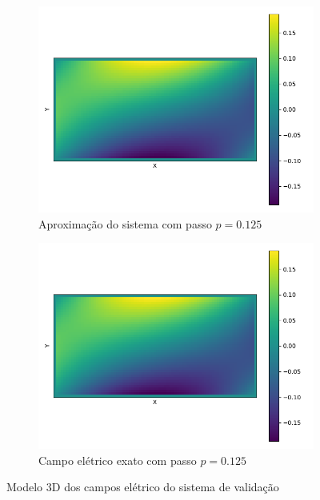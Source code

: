 \documentclass[oneside]{abntex2}
\begin{document}
\begin{figure}[h]
  \begin{subfigure}[b]{0.5\textwidth}
    \includegraphics[width=\textwidth]{imgs/hmap_aprox_val_elet_1250.png}
    \caption{Aproximação do sistema com passo $p = 0.125$}
    \label{3d_aprox_val_1250}
  \end{subfigure}
  \begin{subfigure}[b]{0.5\textwidth}
    \includegraphics[width=\textwidth]{imgs/hmap_grnd_val_elet_1250.png}
    \caption{Campo elétrico exato com passo $p = 0.125$}
    \label{3d_exat_val_1250}
  \end{subfigure}
  \caption{Modelo 3D dos campos elétrico do sistema de validação}
\end{figure}
\end{document}
